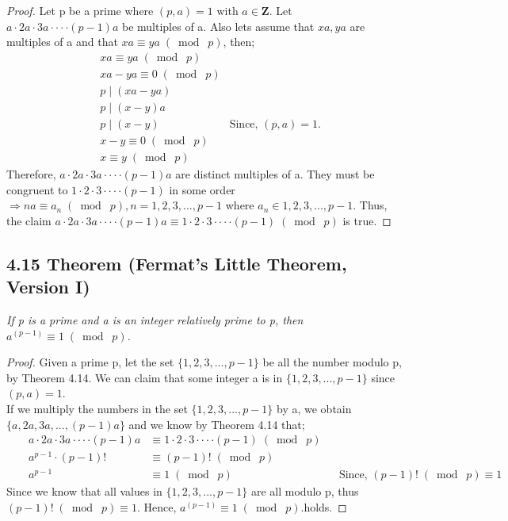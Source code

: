 \documentclass{article}
\begin{document}
\begin{proof}
Let p be a prime where $(p, a) = 1$ with $a \in \mathbf{Z}$. Let $a \cdot 2a \cdot 3a \cdot \cdot \cdot \cdot (p-1)a$ be multiples of a. Also lets assume that $xa, ya$ are multiples of a and that $xa \equiv ya \;(\bmod\; p)$, then;
\begin{align*}
    &xa \equiv ya \;(\bmod\; p)&\\
    &xa - ya \equiv 0 \;(\bmod\; p)&\\
    &p \mid (xa - ya)&\\
    &p \mid (x - y)a&\\
    &p \mid (x - y)& \text{Since, $(p, a) = 1$}.\\
    &x - y \equiv 0 \;(\bmod\; p)&\\
    &x \equiv y \;(\bmod\; p)&
\end{align*}
Therefore, $a \cdot 2a \cdot 3a \cdot \cdot \cdot \cdot (p-1)a$ are distinct multiples of a. They must be congruent to $1 \cdot 2 \cdot 3 \cdot \cdot \cdot \cdot (p-1)$ in some order $\Longrightarrow na \equiv a_n \;(\bmod\; p), n = 1,2,3,...,p-1$ where $a_n \in {1,2,3,...,p-1}$. Thus, the claim $a \cdot 2a \cdot 3a \cdot \cdot \cdot \cdot (p-1)a \equiv 1 \cdot 2 \cdot 3 \cdot \cdot \cdot \cdot (p-1) \;(\bmod\; p)$ is true.
\end{proof}

\subsection*{4.15 Theorem (Fermat's Little Theorem, Version I)} 
\quad \textit{If p is a prime and a is an integer relatively prime to p, then $a^{(p-1)} \equiv 1 \;(\bmod\; p)$.}

\begin{proof}
Given a prime p, let the set $\{1,2,3,...,p-1\}$ be all the number modulo p, by Theorem 4.14. We can claim that some integer a is in $\{1,2,3,...,p-1\}$ since $(p, a) = 1$.\\
If we multiply the numbers in the set $\{1,2,3,...,p-1\}$ by a, we obtain $\{a,2a,3a,...,(p-1)a\}$ and we know by Theorem 4.14 that;
\begin{align*}
    &&a \cdot 2a \cdot 3a \cdot \cdot \cdot \cdot (p-1)a &\equiv 1 \cdot 2 \cdot 3 \cdot \cdot \cdot \cdot (p-1) \;(\bmod\; p)&&\\
    &&a^{p-1} \cdot (p-1)! &\equiv (p-1)! \;(\bmod\; p)&&\\
    &&a^{p-1} &\equiv 1 \;(\bmod\; p)&& \text{Since, }(p-1)! \;(\bmod\; p) \equiv 1
\end{align*}
Since we know that all values in $\{1,2,3,...,p-1\}$ are all modulo p, thus $(p-1)! \;(\bmod\; p) \equiv 1$. Hence, $a^{(p-1)} \equiv 1 \;(\bmod\; p)$.holds.
\end{proof}
\end{document}
